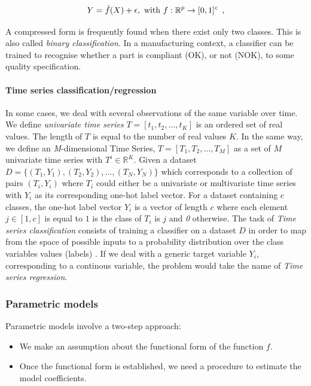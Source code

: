 \begin{equation}
  Y=\hat{f}(X)+ \epsilon, \textnormal{ with } f:\mathbb{R}^{p} \rightarrow [0,1]^{c}
  \enspace,
\end{equation}

A compressed form is frequently found when there exist only two classes. This is also called \textit{binary classification}. In a manufacturing context, a classifier can be trained to recognise whether a part is compliant (OK), or not (NOK), to some quality specification.   

\paragraph{Time series classification/regression}

In some cases, we deal with several observations of the same variable over time. We define \textit{univariate time series} $T = [t_{1}, t_{2}, \dots, t_{K}]$ is an ordered set of real values. The length of $T$ is equal to the number of real values $K$. In the same way, we define an \textit{M}-dimensional Time Series, $T = [T_{1}, T_{2}, \dots, T_{M}]$ as a set of $M$ univariate time series with $T^{i} \in \mathbb{R}^{K}$. Given a dataset $D = \{(T_{1}, Y_{1}),(T_{2}, Y_{2}),\dots,(T_{N}, Y_{N})\}$ which corresponds to a collection of pairs $(T_{i}, Y_{i})$ where $T_i$ could either be a univariate or multivariate time series with $Y_{i}$ as its corresponding one-hot label vector. For a dataset containing $c$ classes, the one-hot label vector $Y_{i}$ is a vector of length $c$ where each element $j \in [1, c]$ is equal to $1$ is the class of $T_{i}$  is $j$ and \textit{0} otherwise. The task of \textit{Time series classification} consists of training a classifier on a dataset $D$ in order to map from the space of possible inputs to a probability distribution over the class variables values (labels) \citep{fawaz2019deep}. If we deal with a generic target variable $Y_{i}$, corresponding to a continous variable, the problem would take the name of \textit{Time series regression}. 


\subsubsection{Parametric models} \label{Parametric models}

Parametric models involve a two-step approach:
\begin{itemize}
    \item We make an assumption about the functional form of the function $f$.  
    \item Once the functional form is established, we need a procedure to estimate the model coefficients. 

\end{itemize}
	 
